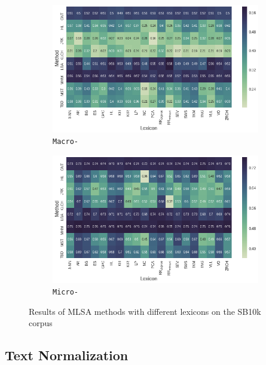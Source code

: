 \begin{figure}
{
\centering
\begin{subfigure}{.5\textwidth}
  \centering
  \includegraphics[width=\linewidth]{img/cgsa_sb10k_macro_lexicons.png}
  \caption{\texttt{Macro-\F}}\label{cgsa:fig:sb10k-lexicon-macro}
\end{subfigure}%
\begin{subfigure}{.5\textwidth}
  \centering
  \includegraphics[width=\linewidth]{img/cgsa_sb10k_micro_lexicons.png}
  \caption{\texttt{Micro-\F}}\label{cgsa:fig:sb10k-lexicon-micro}
\end{subfigure}
}
\caption[MLSA results on SB10k with different lexicons]{Results of MLSA
  methods with different lexicons on the SB10k
  corpus}\label{cgsa:fig:sb10k-lexicon-effect}
\end{figure}


\subsection{Text Normalization}

